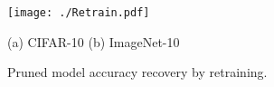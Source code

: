 \documentclass{article} %
\begin{document}
\begin{figure}[t]
  \centering
  \texttt{[image: ./Retrain.pdf]}
  \vspace{-6mm}
  \caption*{\hspace{2mm}(a) CIFAR-10\hspace{50mm} (b) ImageNet-10}
  \caption{Pruned model accuracy recovery by retraining.}
  \label{fig:Retrain}
  \vspace{-2mm}
\end{figure}\begin{comment}
\begin{table}[t]
\caption{VGG on Cifar10 Pruning Configuration}
\centering
\begin{tabular}{llllllll}
\toprule
                 &        &         & base   & prune A & A-$\ell_1$ & prune B & B-$\ell_1$  \\ 
layer            & output & cluster & filter & filter  & filter     & filter  & filter    \\ \midrule
Conv1\_1         & 32x32  & 15      & 64     & 19      & 19         & 36      & 36      \\
Conv2\_1         & 16x16  & 20      & 128    & 8       & 8          & 38      & 38      \\
Conv3\_1         &  8x8   & 26      & 256    & 21      & 21         & 64      & 64      \\
Conv4\_1         &  4x4   & 27      & 512    & 146     & 146        & 329     & 329     \\
Conv5\_1         &  2x2   & 46      & 512    & 398     & 398      & 483     & 483     \\ \hline
p                &        &         &        & 0.5     & -        & 1       & -     \\
FLOPs (x$10^{8}$)&  3.13  &         &  -     & 1.85    & 1.85       & 1.03    & 1.03    \\
FLOPs reduction  &        &         &  -     & \textbf{41\%}    & 41\%      & \textbf{68\%}        & 68\%     \\
prune accuracy   &        &         &  -     & 88.1\%  & 82.4\%     & 72.1\%  & 60.2\%      \\
retrain accuracy &        &         & 90.2\%*& \textbf{90.3\%}  & 89.82\%     & \textbf{89.92\%}   & 89.73\%  \\ \bottomrule
\end{tabular}
\caption*{\hspace{-105mm}\footnotesize{*Baseline accuracy}}
\label{tab:VGG}
\end{table}



\end{comment}
\end{document}
